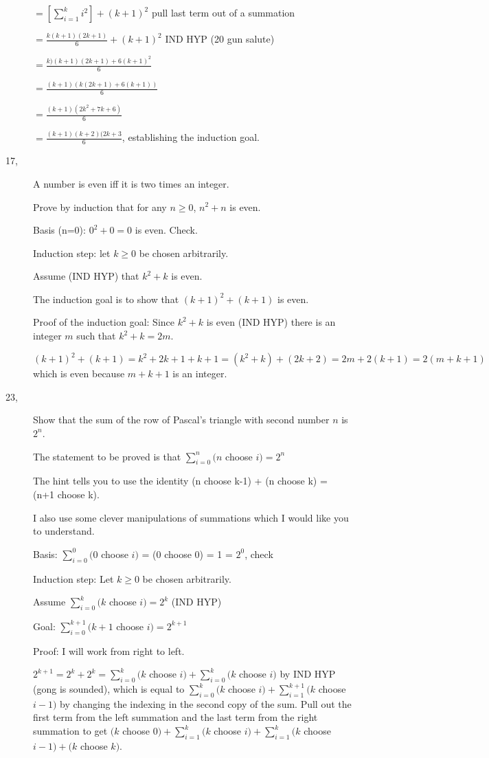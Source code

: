 \documentclass[12pt]{article}
\begin{document}
\begin{description}
$ = [\sum_{i=1}^{k} i^2] + (k+1)^2$  pull last term out of a summation

$= \frac{k(k+1)(2k+1)}6 + (k+1)^2$  IND HYP (20 gun salute)

$ = \frac{k)(k+1)(2k+1) + 6 (k+1)^2}6$

$ = \frac{(k+1)(k(2k+1) + 6(k+1))}6$

$ = \frac{(k+1)(2k^2+7k+6)}6$

$= \frac{(k+1)(k+2)(2k+3}6$, establishing the induction goal.

\item[ 17,]  A number is even iff it is two times an integer.

Prove by induction that for any $n \geq 0$, $n^2+n$ is even.

Basis (n=0):  $0^2+0=0$ is even.  Check.

Induction step:  let $k \geq 0$ be chosen arbitrarily.

Assume (IND HYP) that $k^2+k$ is even.

The induction goal is to show that $(k+1)^2 + (k +1)$ is even.

Proof of the induction goal:  Since $k^2+k$ is even (IND HYP) there is an integer $m$ such that $k^2+k = 2m$.

$(k+1)^2 + (k+1) = k^2+2k+1+k+1 = (k^2+k)+(2k+2) = 2m + 2(k+1) = 2(m+k+1)$ which is even because $m+k+1$ is an integer.

\item[ 23,]   Show that the sum of the row of Pascal's triangle with second number $n$ is $2^n$.

The statement to be proved is that $\sum_{i=0}^n (n$ choose $i) = 2^n$

The hint tells you to use the identity (n choose k-1) + (n choose k) = (n+1 choose k).

I also use some clever manipulations of summations which I would like you to understand.

Basis:  $\sum_{i=0}^0 (0$ choose $i)$ = (0 choose 0) = 1 = $2^0$, check

Induction step:  Let $k \geq 0$ be chosen arbitrarily.

Assume $\sum_{i=0}^k (k$ choose $i) = 2^k $  (IND HYP)

Goal:  $\sum_{i=0}^{k+1} (k+1$ choose $i) = 2^{k+1} $

Proof:  I will work from right to left.

$2^{k+1} = 2^k + 2^k = \sum_{i=0}^k (k$ choose $i) + \sum_{i=0}^k (k$ choose $i)$ by IND HYP (gong is sounded),
which is equal to  \newline $\sum_{i=0}^k (k$ choose $i) + \sum_{i=1}^{k+1} (k$ choose $i-1)$ by changing the indexing in the second copy of the sum.  Pull out the first term from the left summation and the last term from the right summation to get
\newline $(k$ choose $0) + \sum_{i=1}^k (k$ choose $i) + \sum_{i=1}^{k} (k$ choose $i-1)+ (k$ choose $k)$.


\end{description}
\end{document}
